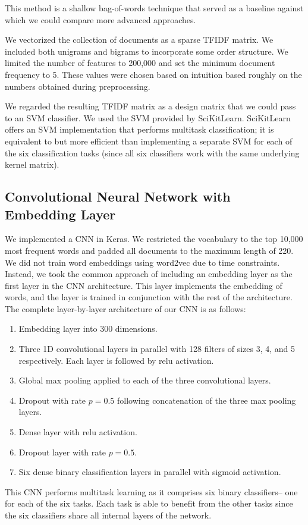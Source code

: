 \documentclass[12pt]{article}
\begin{document}
This method is a shallow bag-of-words technique that served as a baseline against which we could compare more advanced approaches.

We vectorized the collection of documents as a sparse TFIDF matrix. We included both unigrams and bigrams to incorporate some order structure. We limited the number of features to 200,000 and set the minimum document frequency to 5. These values were chosen based on intuition based roughly on the numbers obtained during preprocessing.

We regarded the resulting TFIDF matrix as a design matrix that we could pass to an SVM classifier. We used the SVM provided by SciKitLearn. SciKitLearn offers an SVM implementation that performs multitask classification; it is equivalent to but more efficient than implementing a separate SVM for each of the six classification tasks (since all six classifiers work with the same underlying kernel matrix).

\subsection{Convolutional Neural Network with Embedding Layer}

We implemented a CNN in Keras. We restricted the vocabulary to the top 10,000 most frequent words and padded all documents to the maximum length of 220. We did not train word embeddings using word2vec due to time constraints. Instead, we took the common approach of including an embedding layer as the first layer in the CNN architecture. This layer implements the embedding of words, and the layer is trained in conjunction with the rest of the architecture. The complete layer-by-layer architecture of our CNN is as follows:
\begin{enumerate}
\item Embedding layer into 300 dimensions.
\item Three 1D convolutional layers in parallel with 128 filters of sizes 3, 4, and 5 respectively. Each layer is followed by relu activation.
\item Global max pooling applied to each of the three convolutional layers.
\item Dropout with rate $p=0.5$ following concatenation of the three max pooling layers.
\item Dense layer with relu activation.
\item Dropout layer with rate $p=0.5$.
\item Six dense binary classification layers in parallel with sigmoid activation.
\end{enumerate}
This CNN performs multitask learning as it comprises six binary classifiers-- one for each of the six tasks. Each task is able to benefit from the other tasks since the six classifiers share all internal layers of the network.
\end{document}
